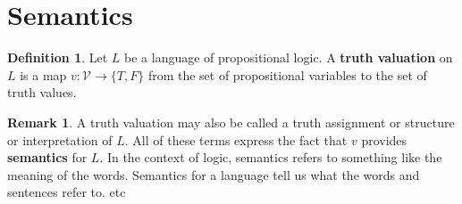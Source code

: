 \documentclass[12pt]{article}
\theoremstyle{definition}
\newtheorem{definition}[theorem]{Definition}
\newtheorem{remark}[theorem]{Remark}
\newcommand{\<}{\langle}
\renewcommand{\>}{\rangle}
\newcommand{\VV}{\mathcal{V}}
\newcommand{\keyword}{\textbf}
\begin{document}
\section{Semantics}

\begin{definition}
    Let $L$ be a language of propositional logic.
    A \keyword{truth valuation} on $L$ is a map $v : \VV \to \{T, F\}$ from the set of propositional variables to the set of truth values.
\end{definition}

\begin{remark}
    A truth valuation may also be called a truth assignment or structure or interpretation of $L$.
    All of these terms express the fact that $v$ provides \keyword{semantics} for $L$.
    In the context of logic, semantics refers to something like the meaning of the words.
    Semantics for a language tell us what the words and sentences refer to.
    etc
\end{remark}
\end{document}
